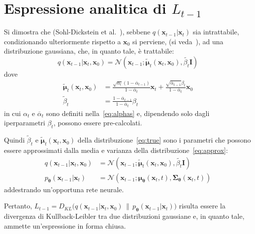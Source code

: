 \section*{Espressione analitica di $L_{t-1}$}\label{sec:detailed_loss_term}
Si dimostra che (Sohl-Dickstein et al.~\cite{sohl-dickstein2015}), sebbene $q(\mathbf{x}_{t-1}|\mathbf{x}_t)$ sia intrattabile, 
condizionando ulteriormente rispetto a $\mathbf{x}_0$ si perviene, 
(si veda~\cite{nain2022}), ad una distribuzione gaussiana, che, in quanto tale, è trattabile:
\begin{equation}
    q(\mathbf{x}_{t-1}|\mathbf{x}_t,\mathbf{x}_0) = \mathcal{N}(\mathbf{x}_{t-1}; \tilde{\bm{\mu}}_{t}(\mathbf{x}_t,\mathbf{x}_0),\tilde{\beta_t} \bm{I}) 
\end{equation}
dove 
\begin{align}
    \tilde{\bm{\mu}}_t(\mathbf{x}_t,\mathbf{x}_0) &=  \frac{\sqrt{\alpha_t}(1-\overline{\alpha}_{t-1})}{1-\overline{\alpha}_t}\mathbf{x}_t+
                                                      \frac{\sqrt{\overline{\alpha}_{t-1}}\beta_t}{1-\overline{\alpha}_t}\mathbf{x}_0 \label{eq:simplify}\\
    \tilde{\beta}_t &= \frac{1-\overline{\alpha}_{t-1}}{1-\overline{\alpha}_t}\beta_t
\end{align}
in cui $\alpha_t$ e $\overline{\alpha}_t$ sono definiti nella~\eqref{eq:alphas} e, dipendendo solo dagli iperparametri $\beta_t$, 
possono essere pre-calcolati.

Quindi $\tilde{\beta}_t$ e $\tilde{\bm{\mu}}_t(\mathbf{x}_t,\mathbf{x}_0)$ della distribuzione~\eqref{eq:true} sono i parametri 
che possono essere approssimati dalla media e varianza della distribuzione~\eqref{eq:approx}:
\begin{align}
    q(\mathbf{x}_{t-1}|\mathbf{x}_t,\mathbf{x}_0) &= \mathcal{N}(\mathbf{x}_{t-1}; \tilde{\bm{\mu}}_{t}(\mathbf{x}_t,\mathbf{x}_0),\tilde{\beta_t} \bm{I})\label{eq:true} \\
    p_{\bm{\theta}}(\mathbf{x}_{t-1}|\mathbf{x}_t)&=\mathcal{N}(\mathbf{x}_{t-1};\bm{\mu}_{\bm{\theta}}(\mathbf{x}_t,t),\bm{\Sigma}_{\bm{\theta}}(\mathbf{x}_t,t))\label{eq:approx}
\end{align}
addestrando un'opportuna rete neurale.

Pertanto, $L_{t-1}=D_{KL}\bigl(q(\mathbf{x}_{t-1}|\mathbf{x}_t,\mathbf{x}_0)\,\|\,p_{\bm{\theta}}(\mathbf{x}_{t-1}|\mathbf{x}_t)\bigr)$ 
risulta essere la divergenza di Kullback-Leibler tra due distribuzioni gaussiane e, in quanto tale, ammette un'espressione in forma chiusa.

